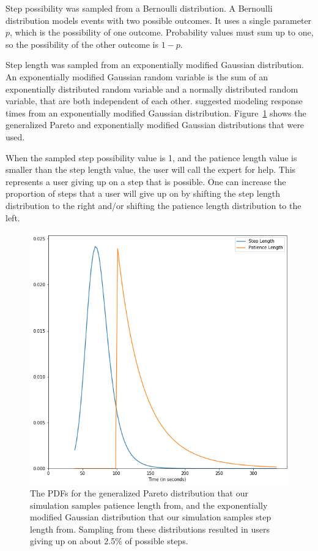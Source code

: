 Step possibility was sampled from a Bernoulli distribution.
A Bernoulli distribution models events with two possible outcomes.
It uses a single parameter $p$, which is the possibility of one outcome.
Probability values must sum up to one, so the possibility of the other outcome
is $1-p$.

Step length was sampled from an exponentially modified Gaussian distribution.
An exponentially modified Gaussian random variable is the sum of an
exponentially distributed random variable and a normally distributed random
variable, that are both independent of each other.
\citet{dawson1988fitting} suggested modeling response times from an
exponentially modified Gaussian distribution.
Figure~\ref{fig:step_patience} shows the generalized Pareto and exponentially
modified Gaussian distributions that were used.

When the sampled step possibility value is 1, and the patience length value is
smaller than the step length value, the user will call the expert for help.
This represents a user giving up on a step that is possible.
One can increase the proportion of steps that a user will give up on by shifting
the step length distribution to the right and/or shifting the patience length
distribution to the left.

\begin{figure}[H]
  \includegraphics[width=\textwidth]{figures/montecarlo/step_patience.png}
  \caption{
    The PDFs for the generalized Pareto distribution that our simulation samples
    patience length from, and the exponentially modified Gaussian distribution
    that our simulation samples step length from.
    Sampling from these distributions resulted in users giving up on about 2.5\%
    of possible steps.
  }\label{fig:step_patience}
\end{figure}

